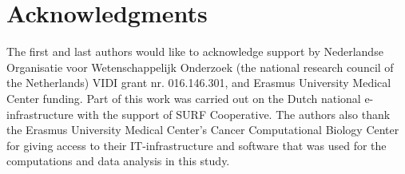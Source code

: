 \section*{Acknowledgments}
The first and last authors would like to acknowledge support by Nederlandse Organisatie voor Wetenschappelijk Onderzoek (the national research council of the Netherlands) VIDI grant nr. 016.146.301, and Erasmus University Medical Center funding. Part of this work was carried out on the Dutch national e-infrastructure with the support of SURF Cooperative. The authors also thank the Erasmus University Medical Center's Cancer Computational Biology Center for giving access to their IT-infrastructure and software that was used for the computations and data analysis in this study.